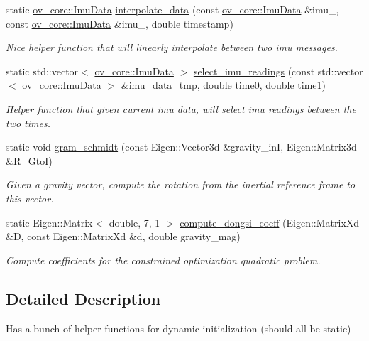 \begin{DoxyCompactItemize}
\item 
static \hyperlink{structov__core_1_1ImuData}{ov\+\_\+core\+::\+Imu\+Data} \hyperlink{classov__init_1_1InitializerHelper_aa5c39a05a5c4328b02907012922fe4cf}{interpolate\+\_\+data} (const \hyperlink{structov__core_1_1ImuData}{ov\+\_\+core\+::\+Imu\+Data} \&imu\+\_, const \hyperlink{structov__core_1_1ImuData}{ov\+\_\+core\+::\+Imu\+Data} \&imu\+\_, double timestamp)
\begin{DoxyCompactList}\small\item\em Nice helper function that will linearly interpolate between two imu messages. \end{DoxyCompactList}\item 
static std\+::vector$<$ \hyperlink{structov__core_1_1ImuData}{ov\+\_\+core\+::\+Imu\+Data} $>$ \hyperlink{classov__init_1_1InitializerHelper_ad295c3818e37e9bf44c17515fca18003}{select\+\_\+imu\+\_\+readings} (const std\+::vector$<$ \hyperlink{structov__core_1_1ImuData}{ov\+\_\+core\+::\+Imu\+Data} $>$ \&imu\+\_\+data\+\_\+tmp, double time0, double time1)
\begin{DoxyCompactList}\small\item\em Helper function that given current imu data, will select imu readings between the two times. \end{DoxyCompactList}\item 
static void \hyperlink{classov__init_1_1InitializerHelper_a667b07d7092365ad12df893ae3904f6c}{gram\+\_\+schmidt} (const Eigen\+::\+Vector3d \&gravity\+\_\+inI, Eigen\+::\+Matrix3d \&R\+\_\+\+GtoI)
\begin{DoxyCompactList}\small\item\em Given a gravity vector, compute the rotation from the inertial reference frame to this vector. \end{DoxyCompactList}\item 
static Eigen\+::\+Matrix$<$ double, 7, 1 $>$ \hyperlink{classov__init_1_1InitializerHelper_acf91adc24386b43a62ff8d354bde0924}{compute\+\_\+dongsi\+\_\+coeff} (Eigen\+::\+Matrix\+Xd \&D, const Eigen\+::\+Matrix\+Xd \&d, double gravity\+\_\+mag)
\begin{DoxyCompactList}\small\item\em Compute coefficients for the constrained optimization quadratic problem. \end{DoxyCompactList}\end{DoxyCompactItemize}


\subsection{Detailed Description}
Has a bunch of helper functions for dynamic initialization (should all be static) 

